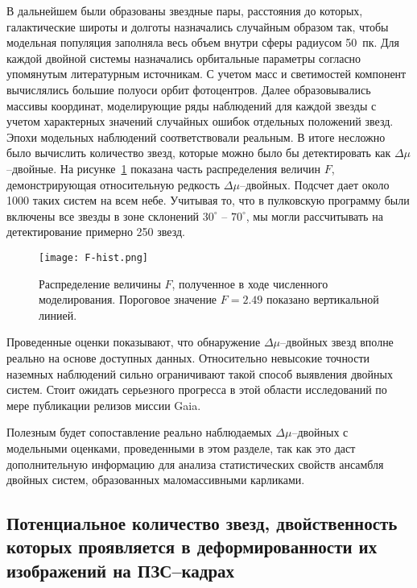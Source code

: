 В дальнейшем были образованы звездные пары, расстояния до которых, галактические широты и долготы назначались случайным образом так, чтобы модельная популяция заполняла весь объем внутри сферы радиусом 50~пк. Для каждой двойной системы назначались орбитальные параметры согласно упомянутым литературным источникам. С учетом масс и светимостей компонент вычислялись большие полуоси орбит фотоцентров. Далее образовывались массивы координат, моделирующие ряды наблюдений для каждой звезды с учетом характерных значений случайных ошибок отдельных положений звезд. Эпохи модельных наблюдений соответствовали реальным. В итоге несложно было вычислить количество звезд, которые можно было бы детектировать как $\Delta\mu$--двойные.  На рисунке~\ref{fig:F-hist} показана часть распределения величин $F$, демонстрирующая относительную редкость $\Delta\mu$--двойных. Подсчет дает около 1000 таких систем на всем небе. Учитывая то, что в пулковскую программу были включены все звезды в зоне склонений	$30^\circ$ -- $70^\circ$, мы могли рассчитывать на детектирование примерно 250 звезд. 

\begin{figure}[pt]\label{fig:F-hist}
\centering
\texttt{[image: F-hist.png]}
\caption{Распределение величины $F$, полученное в ходе численного моделирования. Пороговое значение $F=2.49$ показано вертикальной линией. }
\end{figure}

Проведенные оценки показывают, что обнаружение $\Delta\mu$--двойных звезд вполне реально на основе доступных данных. Относительно невысокие точности наземных наблюдений сильно  ограничивают такой способ выявления двойных систем. Стоит ожидать серьезного прогресса в этой области исследований по мере публикации релизов миссии Gaia.

Полезным будет сопоставление реально наблюдаемых  $\Delta\mu$--двойных с модельными оценками, проведенными в этом разделе, так как это даст дополнительную информацию для анализа статистических свойств ансамбля двойных систем, образованных маломассивными карликами.

\subsection{Потенциальное количество звезд, двойственность которых проявляется в деформированности их изображений на ПЗС--кадрах}\label{subsec:ch1/sect2/sub3}

